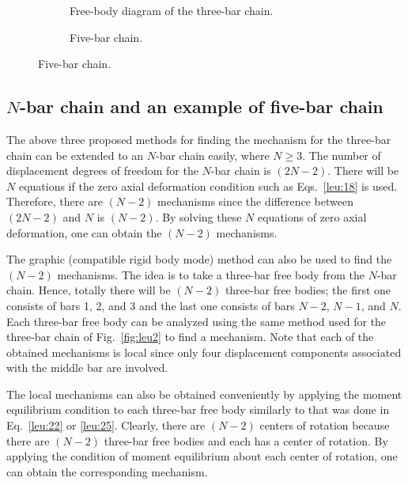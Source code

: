 \begin{figure}[H]
  \centering
  \begin{subfigure}[b]{0.42\textwidth}\centering
    \caption{Free-body diagram of the three-bar chain.}\label{fig:leu5}\end{subfigure}\hfill
  \begin{subfigure}[b]{0.55\textwidth}\centering
    \caption{Five-bar chain.}\label{fig:leu6}\end{subfigure}
\end{figure}

\subsection*{\texorpdfstring{$N$}{N}-bar chain and an example of five-bar chain}
The above three proposed methods for finding the mechanism for the three-bar chain can be extended to an $N$-bar chain easily, where $N\geq 3$. The number of displacement degrees of freedom for the $N$-bar chain is $(2N-2)$. There will be $N$ equations if the zero axial deformation condition such as Eqs.~\eqref{leu:18} is used. Therefore, there are $(N-2)$ mechanisms since the difference between $(2N-2)$ and $N$ is $(N-2)$. By solving these $N$ equations of zero axial deformation, one can obtain the $(N-2)$ mechanisms.

The graphic (compatible rigid body mode) method can also be used to find the $(N-2)$ mechanisms. The idea is to take a three-bar free body from the $N$-bar chain. Hence, totally there will be $(N-2)$ three-bar free bodies; the first one consists of bars 1, 2, and 3 and the last one consists of bars $N-2$, $N-1$, and $N$. Each three-bar free body can be analyzed using the same method used for the three-bar chain of Fig.~\ref{fig:leu2} to find a mechanism. Note that each of the obtained mechanisms is local since only four displacement components associated with the middle bar are involved.

The local mechanisms can also be obtained conveniently by applying the moment equilibrium condition to each three-bar free body similarly to that was done in Eq.~\eqref{leu:22} or \eqref{leu:25}. Clearly, there are $(N-2)$ centers of rotation because there are $(N-2)$ three-bar free bodies and each has a center of rotation. By applying the condition of moment equilibrium about each center of rotation, one can obtain the corresponding mechanism.

